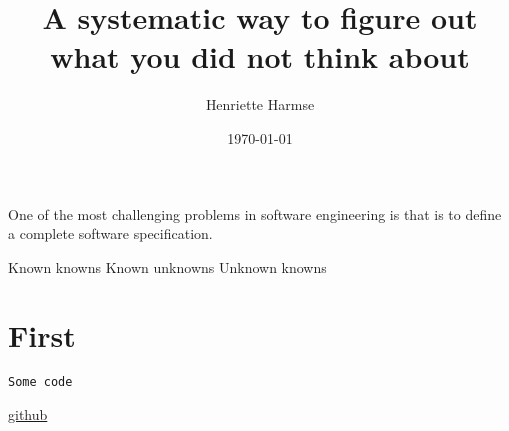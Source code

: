 \documentclass{amsart}
\title{A systematic way to figure out what you did not think about}
\author{Henriette Harmse}
\date{\today}
\begin{document}
  \maketitle
   One of the most challenging problems in software engineering is that is to define a complete software specification.
   
   Known knowns
   Known unknowns
   Unknown knowns 
   
  \section{First}
  \cite{Aameri2015}

\begin{small}
\begin{verbatim} 
Some code
\end{verbatim}
\end{small}

\href{http://}{github}
  
  
  
 
\end{document}
